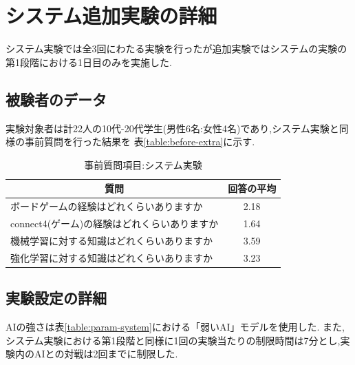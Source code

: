 \chapter{システム追加実験の詳細}
\label{chap:system}
システム実験では全3回にわたる実験を行ったが追加実験ではシステムの実験の第1段階における1日目のみを実施した.
\section{被験者のデータ}
実験対象者は計22人の10代-20代学生(男性6名:女性4名)であり,システム実験と同様の事前質問を行った結果を
表\ref{table:before-extra}に示す.


\begin{table}[H]
    \caption{事前質問項目:システム実験}
    \label{table:before}
	\scriptsize
    \begin{tabular}{l||c}
        \multicolumn{1}{c|}{質問} & 回答の平均\\ \hline \hline
        ボードゲームの経験はどれくらいありますか & 2.18\\
        connect4(ゲーム)の経験はどれくらいありますか& 1.64\\\hline
        機械学習に対する知識はどれくらいありますか& 3.59\\
        強化学習に対する知識はどれくらいありますか& 3.23\\
    \end{tabular}
    
\end{table}
\section{実験設定の詳細}
AIの強さは表\ref{table:param-system}における「弱いAI」モデルを使用した.
また,システム実験における第1段階と同様に1回の実験当たりの制限時間は7分とし,実験内のAIとの対戦は2回までに制限した.

